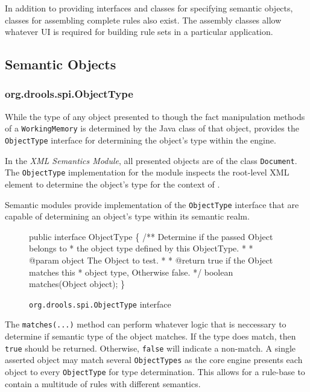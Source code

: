 In addition to providing interfaces and classes for specifying
semantic objects, classes for assembling complete rules also exist.
The assembly classes allow whatever UI is required for building rule
sets in a particular application.  

\subsection{Semantic Objects}

\subsubsection{org.drools.spi.ObjectType}

While the type of any object presented to \drools{} though
the fact manipulation methods of a \verb|WorkingMemory| is determined
by the Java class of that object, \drools{} provides the
\verb|ObjectType| interface for determining the object's type within
the engine.

In the \emph{XML Semantics Module}, all presented objects are of the
class \verb|Document|.  The \verb|ObjectType| implementation
for the module inspects the root-level XML element to determine the
object's type for the context of \drools{}.

Semantic modules provide implementation of the \verb|ObjectType|
interface that are capable of determining an object's type within
its semantic realm.

\begin{figure}
\begin{codelisting}
public interface ObjectType
\{
    /** Determine if the passed Object belongs to 
     *  the object type defined by this ObjectType.
     *
     *  @param object The Object to test.
     *
     *  @return true if the Object matches this 
     *          object type, Otherwise false.
     */
    boolean matches(Object object);
\}
\end{codelisting}
\caption{\texttt{org.drools.spi.ObjectType} interface}
\label{code.ObjectType}
\end{figure}

The \verb|matches(...)| method can perform whatever logic that is
neccessary to determine if semantic type of the object matches.  If
the type does match, then \verb|true| should be returned.  Otherwise, 
\verb|false| will indicate a non-match. A single asserted object may 
match several \verb|ObjectTypes| as the core engine presents each 
object to every \verb|ObjectType| for type determination.  This
allows for a rule-base to contain a multitude of rules with different
semantics.  

